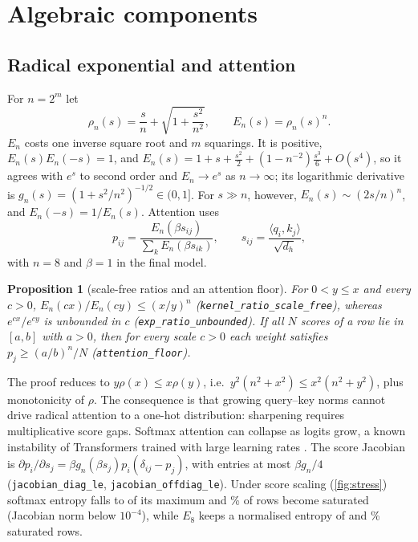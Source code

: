\documentclass[10pt]{article}
\newtheorem{proposition}{Proposition}
\newcommand{\lean}[1]{\texttt{\small #1}}
\begin{document}
\section{Algebraic components}
\label{sec:model}

\subsection{Radical exponential and attention}
\label{sec:attention}

For $n=2^m$ let
\begin{equation}
\rho_n(s)=\frac{s}{n}+\sqrt{1+\frac{s^2}{n^2}},\qquad E_n(s)=\rho_n(s)^n .
\end{equation}
$E_n$ costs one inverse square root and $m$ squarings. It is positive,
$E_n(s)E_n(-s)=1$, and
$E_n(s)=1+s+\tfrac{s^2}{2}+(1-n^{-2})\tfrac{s^3}{6}+O(s^4)$, so it agrees with
$e^s$ to second order and $E_n\to e^s$ as $n\to\infty$; its logarithmic
derivative is $g_n(s)=(1+s^2/n^2)^{-1/2}\in(0,1]$. For $s\gg n$, however,
$E_n(s)\sim(2s/n)^n$, and $E_n(-s)=1/E_n(s)$. Attention uses
\begin{equation}
p_{ij}=\frac{E_n(\beta s_{ij})}{\sum_k E_n(\beta s_{ik})},\qquad
s_{ij}=\frac{\langle q_i,k_j\rangle}{\sqrt{d_h}},
\end{equation}
with $n=8$ and $\beta=1$ in the final model.

\begin{proposition}[scale-free ratios and an attention floor]
\label{prop:floor}
For $0<y\le x$ and every $c>0$,
$E_n(cx)/E_n(cy)\le (x/y)^n$ (\lean{kernel\_ratio\_scale\_free}), whereas
$e^{cx}/e^{cy}$ is unbounded in $c$ (\lean{exp\_ratio\_unbounded}). If all
$N$ scores of a row lie in $[a,b]$ with $a>0$, then for every scale $c>0$
each weight satisfies $p_j\ge (a/b)^n/N$ (\lean{attention\_floor}).
\end{proposition}

The proof reduces to $y\rho(x)\le x\rho(y)$, i.e.\
$y^2(n^2+x^2)\le x^2(n^2+y^2)$, plus monotonicity of $\rho$. The consequence
is that growing query--key norms cannot drive radical attention to a one-hot
distribution: sharpening requires multiplicative score gaps. Softmax
attention can collapse as logits grow, a known instability of Transformers
trained with large learning rates \cite{zhai2023entropy,dehghani2023vit22b}.
The score Jacobian is $\partial p_i/\partial s_j=\beta g_n(\beta s_j)
p_i(\delta_{ij}-p_j)$, with entries at most $\beta g_n/4$
(\lean{jacobian\_diag\_le}, \lean{jacobian\_offdiag\_le}). Under score
scaling (\cref{fig:stress}) softmax entropy falls to \stressSoftEnt{} of
its maximum and \stressSoftSat\% of rows become saturated (Jacobian norm
below $10^{-4}$), while $E_8$ keeps a normalised entropy of \stressRadEnt{}
and \stressRadSat\% saturated rows.
\end{document}
